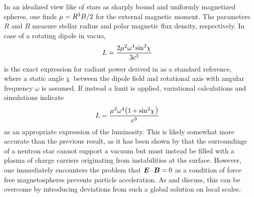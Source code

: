 In an idealized view like \cite{Deutsch_1955} of stars as sharply bound and uniformly magnetized spheres, one finds
$\mu = \kern-0.1pt R^3 B / 2$ for the external magnetic moment. The parameters $R$ and $B$ measure stellar radius and polar magnetic
flux density, respectively. In case of a rotating dipole in vacuo,
\begin{equation}
	L = \frac{2\mu^2 \omega^4 \kern-1.0pt \sin^2 \kern-2.0pt \chi \kern+1.0pt}{3c^3}
	\label{eqn:vacuum}
\end{equation}
is the exact expression for radiant power derived in \cite{Jackson_1999} as a standard reference, where a static angle
$\kern-1.0pt \chi \kern+1.0pt$ between the dipole field and rotational axis with angular frequency $\omega$ is assumed. If
instead a  limit is applied, variational calculations \cite{Gruzinov_2006} and  simulations
\cite{Spitkovsky_2006} indicate
\begin{equation}
	L = \frac{\mu^2 \omega^4 \raisebox{0.15ex}{\( \bigl(
	\raisebox{-0.15ex}{\( 1 \kern-0.7pt + \sin^2 \kern-2.0pt \chi \kern+1.0pt \)} \bigr) \)} }{c^3}
	\label{eqn:ffe-mhd}
\end{equation}
as an appropriate expression of the luminosity. This is likely somewhat more accurate than the previous result, as it has been
shown by \cite{Goldreich_1969} that the surroundings of a neutron star cannot support a vacuum but must instead be filled with a
plasma of charge carriers originating from instabilities at the surface. However, one immediately encounters the problem that
$\bm{E} \cdot \kern-1.0pt \bm{B} = \kern-0.5pt 0$ as a condition of force free magnetospheres prevents particle acceleration. As
\cite{Li_2012} and \cite{Gralla_2019} discuss, this can be overcome by introducing deviations from such a global solution on local
scales.

